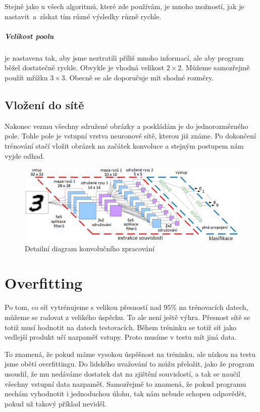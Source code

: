 \documentclass[12pt,a4paper]{report}
\begin{document}
Stejně jako u všech algoritmů, které zde používám, je mnoho možností, jak je nastavit~a~získat tím různé výsledky různě rychle.
\paragraph{Velikost poolu}
je nastavena tak, aby jsme neztratili příliš mnoho informací, ale aby program běžel dostatečně rychle. Obvykle je vhodná velikost $2\times2$. Můžeme samozřejmě použít mřížku $3\times3$. Obecně se ale doporučuje mít shodné rozměry.
\section{Vložení do sítě}
Nakonec vezmu všechny sdružené obrázky a poskládám je do jednorozměrného pole. Tohle pole je vstupní vrstva neuronové sítě, kterou již známe. Po dokončení trénování stačí vložit obrázek na začátek konvoluce a stejným postupem nám vyjde odhad.

\begin{figure}[h]
	\centering
	\includegraphics[width=17cm]{images/convolution}
	\caption{Detailní diagram konvolučního zpracování \cite{kernix}}
\end{figure}

\chapter{Overfitting}
Po tom, co síť vytrénujeme s velikou přesností nad $95\%$ na trénovacích datech, můžeme se radovat z velikého úspěchu. To ale není ještě výhra. Přesnost sítě se totiž musí hodnotit na datech testovacích. Během tréninku se totiž síť jako vedlejší produkt učí nazpaměť vstupy. Proto musíme v testu mít jiná data.

To znamená, že pokud máme vysokou úspěšnost na tréninku, ale nízkou na testu jsme obětí overfittingu. Do lidského uvažování to můžu přeložit, jako že program usoudil, že mu nedáváme dostatek dat na zjištění souvislostí, a tak se naučil všechny vstupní data nazpaměť. Samozřejmě to znamená, že pokud programu nechám vyhodnotit i jednoduchou úlohu, tak nám nebude schopen odpovědět, pokud už takový příklad neviděl.
\end{document}
